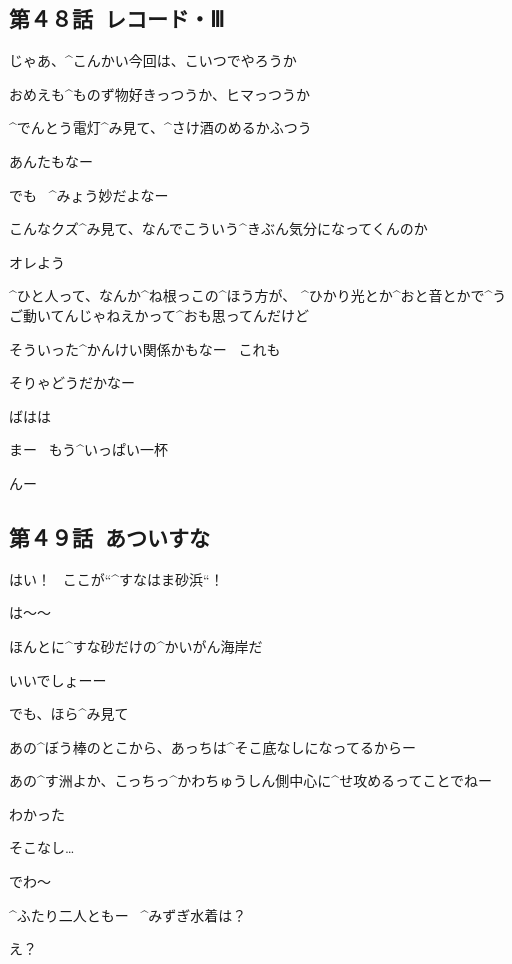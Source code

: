 \subsection{第４８話\ レコード・Ⅲ}

\page[68]
\Person じゃあ、^{こんかい}{今回}は、こいつでやろうか

\Person おめえも^{ものず}{物好}きっつうか、ヒマっつうか

\Person ^{でんとう}{電灯}^{み}{見}て、^{さけ}{酒}のめるかふつう

\Person あんたもなー

\page[70]
\Person でも
\ ^{みょう}{妙}だよなー

\Person こんなクズ^{み}{見}て、なんでこういう^{きぶん}{気分}になってくんのか

\Person オレよう

\Person ^{ひと}{人}って、なんか^{ね}{根}っこの^{ほう}{方}が、
^{ひかり}{光}とか^{おと}{音}とかで^{うご}{動}いてんじゃねえかって^{おも}{思}ってんだけど

\Person そういった^{かんけい}{関係}かもなー
\ これも

\page[71]
\Person そりゃどうだかなー

\Person ばはは

\Person まー
\ もう^{いっぱい}{一杯}

\Person んー


\subsection{第４９話\ あついすな}

\page[78]
\Alpha はい！
\ ここが“^{すなはま}{砂浜}“！

\Takahiro は〜〜

\Takahiro ほんとに^{すな}{砂}だけの^{かいがん}{海岸}だ

\Alpha いいでしょーー

\page[79]
\Alpha でも、ほら^{み}{見}て

\Alpha あの^{ぼう}{棒}のとこから、あっちは^{そこ}{底}なしになってるからー

\Alpha あの^{す}{洲}よか、こっちっ^{かわちゅうしん}{側中心}に^{せ}{攻}めるってことでねー

\Takahiro わかった

\Makki そこなし…

\page[80]
\Makki でわ〜

\page[81]
\Alpha ^{ふたり}{二人}ともー
\ ^{みずぎ}{水着}は？

\Takahiro え？

